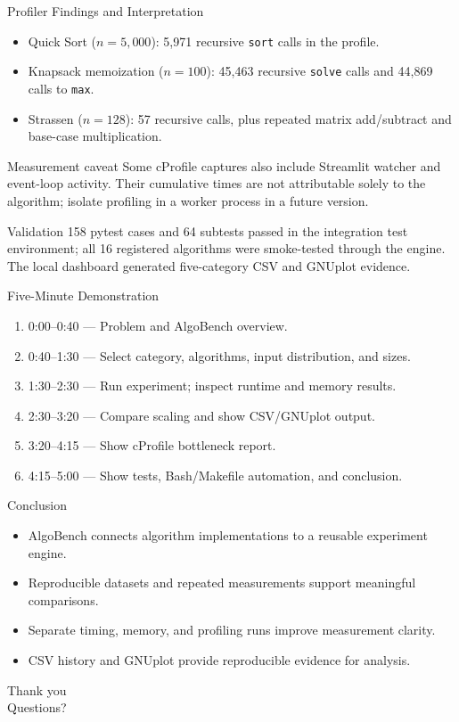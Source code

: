 \documentclass[aspectratio=169]{beamer}
\begin{document}
\begin{frame}{Profiler Findings and Interpretation}
  \small
  \begin{itemize}
    \item Quick Sort ($n=5,000$): 5,971 recursive \texttt{sort} calls in the profile.
    \item Knapsack memoization ($n=100$): 45,463 recursive \texttt{solve} calls and 44,869 calls to \texttt{max}.
    \item Strassen ($n=128$): 57 recursive calls, plus repeated matrix add/subtract and base-case multiplication.
  \end{itemize}
  \begin{alertblock}{Measurement caveat}
    Some cProfile captures also include Streamlit watcher and event-loop activity. Their cumulative times are not attributable solely to the algorithm; isolate profiling in a worker process in a future version.
  \end{alertblock}
  \begin{block}{Validation}
    158 pytest cases and 64 subtests passed in the integration test environment; all 16 registered algorithms were smoke-tested through the engine. The local dashboard generated five-category CSV and GNUplot evidence.
  \end{block}
\end{frame}

\begin{frame}{Five-Minute Demonstration}
  \begin{enumerate}
    \item 0:00--0:40 — Problem and AlgoBench overview.
    \item 0:40--1:30 — Select category, algorithms, input distribution, and sizes.
    \item 1:30--2:30 — Run experiment; inspect runtime and memory results.
    \item 2:30--3:20 — Compare scaling and show CSV/GNUplot output.
    \item 3:20--4:15 — Show cProfile bottleneck report.
    \item 4:15--5:00 — Show tests, Bash/Makefile automation, and conclusion.
  \end{enumerate}
\end{frame}

\begin{frame}{Conclusion}
  \begin{itemize}
    \item AlgoBench connects algorithm implementations to a reusable experiment engine.
    \item Reproducible datasets and repeated measurements support meaningful comparisons.
    \item Separate timing, memory, and profiling runs improve measurement clarity.
    \item CSV history and GNUplot provide reproducible evidence for analysis.
  \end{itemize}
  \vfill
  \centering
  \Large Thank you\\[0.4em]
  \normalsize Questions?
\end{frame}
\end{document}
